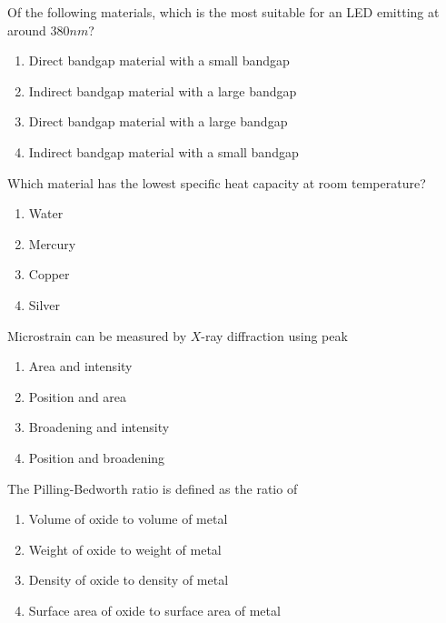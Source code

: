 \item Of the following materials, which is the most suitable for an LED emitting at around $380 nm$?
\begin{enumerate}
    \item Direct bandgap material with a small bandgap
    \item Indirect bandgap material with a large bandgap
    \item Direct bandgap material with a large bandgap
    \item Indirect bandgap material with a small bandgap
\end{enumerate}
\item Which material has the lowest specific heat capacity at room temperature?
\begin{enumerate}
    \item Water \item Mercury \item Copper \item Silver
\end{enumerate}
\item Microstrain can be measured by $X$-ray diffraction using peak
\begin{enumerate}
    \item Area and intensity
    \item Position and area
    \item Broadening and intensity
    \item Position and broadening
\end{enumerate}
\item The Pilling-Bedworth ratio is defined as the ratio of
\begin{enumerate}
    \item Volume of oxide to volume of metal
    \item Weight of oxide to weight of metal
    \item Density of oxide to density of metal
    \item Surface area of oxide to surface area of metal
\end{enumerate}

